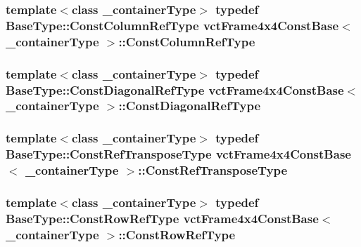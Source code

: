 \subsubsection[{Const\+Column\+Ref\+Type}]{\setlength{\rightskip}{0pt plus 5cm}template$<$class \+\_\+container\+Type$>$ typedef Base\+Type\+::\+Const\+Column\+Ref\+Type {\bf vct\+Frame4x4\+Const\+Base}$<$ \+\_\+container\+Type $>$\+::{\bf Const\+Column\+Ref\+Type}}\label{classvct_frame4x4_const_base_a12760de72da52fc0917ad17373d369f3}
\hypertarget{classvct_frame4x4_const_base_a83c846e0b484264c6d71c101b67d164a}{}
\subsubsection[{Const\+Diagonal\+Ref\+Type}]{\setlength{\rightskip}{0pt plus 5cm}template$<$class \+\_\+container\+Type$>$ typedef Base\+Type\+::\+Const\+Diagonal\+Ref\+Type {\bf vct\+Frame4x4\+Const\+Base}$<$ \+\_\+container\+Type $>$\+::{\bf Const\+Diagonal\+Ref\+Type}}\label{classvct_frame4x4_const_base_a83c846e0b484264c6d71c101b67d164a}
\hypertarget{classvct_frame4x4_const_base_acac151b2d8a361ed229d8cdacac2b01f}{}
\subsubsection[{Const\+Ref\+Transpose\+Type}]{\setlength{\rightskip}{0pt plus 5cm}template$<$class \+\_\+container\+Type$>$ typedef Base\+Type\+::\+Const\+Ref\+Transpose\+Type {\bf vct\+Frame4x4\+Const\+Base}$<$ \+\_\+container\+Type $>$\+::{\bf Const\+Ref\+Transpose\+Type}}\label{classvct_frame4x4_const_base_acac151b2d8a361ed229d8cdacac2b01f}
\hypertarget{classvct_frame4x4_const_base_af18cadccba2812e0d3cad82f43583ab0}{}
\subsubsection[{Const\+Row\+Ref\+Type}]{\setlength{\rightskip}{0pt plus 5cm}template$<$class \+\_\+container\+Type$>$ typedef Base\+Type\+::\+Const\+Row\+Ref\+Type {\bf vct\+Frame4x4\+Const\+Base}$<$ \+\_\+container\+Type $>$\+::{\bf Const\+Row\+Ref\+Type}}\label{classvct_frame4x4_const_base_af18cadccba2812e0d3cad82f43583ab0}
\hypertarget{classvct_frame4x4_const_base_ac8b3e3540ee9e065a519d7b364276662}{}

